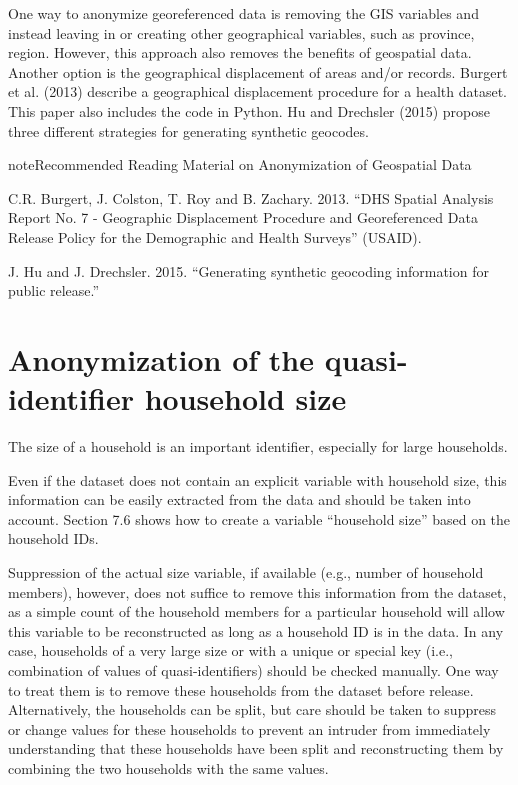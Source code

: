 \documentclass[letterpaper,10pt,english]{sphinxmanual}
\begin{document}
One way to anonymize georeferenced data is removing the GIS variables
and instead leaving in or creating other geographical variables, such as
province, region. However, this approach also removes the benefits of
geospatial data. Another option is the geographical displacement of
areas and/or records. Burgert et al. (2013) describe a geographical
displacement procedure for a health dataset. This paper also includes
the code in Python. Hu and Drechsler (2015) propose three different
strategies for generating synthetic geocodes.

\begin{sphinxadmonition}{note}{Recommended Reading Material on Anonymization of Geospatial Data}

C.R. Burgert, J. Colston, T. Roy and B. Zachary. 2013. “DHS Spatial
Analysis Report No. 7 - Geographic Displacement Procedure and
Georeferenced Data Release Policy for the Demographic and Health
Surveys” (USAID). 

J. Hu and J. Drechsler. 2015. “Generating synthetic geocoding
information for public release.”
\end{sphinxadmonition}


\section{Anonymization of the quasi-identifier household size}
\label{\detokenize{anon_methods:anonymization-of-the-quasi-identifier-household-size}}
The size of a household is an important identifier, especially for large
households. %
\begin{footnote}[22]\sphinxAtStartFootnote
Even if the dataset does not contain an explicit variable with
household size, this information can be easily extracted from the
data and should be taken into account. Section 7.6 shows how to
create a variable “household size” based on the household IDs.
%
\end{footnote}  Suppression of the actual size
variable, if available (e.g., number of household members), however,
does not suffice to remove this information from the dataset, as a
simple count of the household members for a particular household will
allow this variable to be reconstructed as long as a household ID is in
the data. In any case, households of a very large size or with a unique
or special key (i.e., combination of values of quasi-identifiers) should
be checked manually. One way to treat them is to remove these households
from the dataset before release. Alternatively, the households can be
split, but care should be taken to suppress or change values for these
households to prevent an intruder from immediately understanding that
these households have been split and reconstructing them by combining
the two households with the same values.
\end{document}
